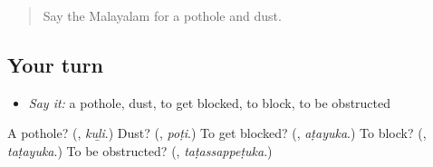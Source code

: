 \label{lesson:ML-R516-review-final-516}



\begin{quote}
Say the Malayalam for a pothole and dust.
\end{quote}

\subsection*{Your turn}
\begin{itemize}
\raggedright
  \item \emph{Say it:} a pothole, dust, to get blocked, to block, to be obstructed
\end{itemize}

\begin{tcolorbox}[breakable,colback=teal!4,colframe=teal!35!black,title={Before you move on}]
A pothole? (\textbf{}, \emph{kuḻi}.) Dust? (\textbf{}, \emph{poṭi}.) To get blocked? (\textbf{}, \emph{aṭayuka}.) To block? (\textbf{}, \emph{taṭayuka}.) To be obstructed? (\textbf{}, \emph{taṭassappeṭuka}.)
\end{tcolorbox}
